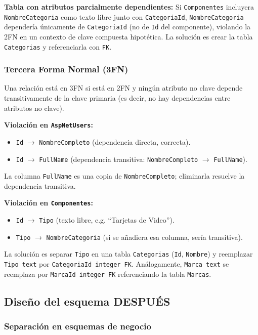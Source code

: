 \textbf{Tabla con atributos parcialmente dependientes:} Si \texttt{Componentes} incluyera \texttt{NombreCategoria} como texto libre junto con \texttt{CategoriaId}, \texttt{NombreCategoria} depender\'ia \'unicamente de \texttt{CategoriaId} (no de \texttt{Id} del componente), violando la 2FN en un contexto de clave compuesta hipot\'etica.
La soluci\'on es crear la tabla \texttt{Categorias} y referenciarla con \texttt{FK}.

\subsubsection{Tercera Forma Normal (3FN)}

Una relaci\'on est\'a en 3FN si est\'a en 2FN y ning\'un atributo no clave depende transitivamente de la clave primaria (es decir, no hay dependencias entre atributos no clave).

\textbf{Violaci\'on en \texttt{AspNetUsers}:}
\begin{itemize}
  \item \texttt{Id} $\rightarrow$ \texttt{NombreCompleto} (dependencia directa, correcta).
  \item \texttt{Id} $\rightarrow$ \texttt{FullName} (dependencia transitiva: \texttt{NombreCompleto} $\rightarrow$ \texttt{FullName}).
\end{itemize}
La columna \texttt{FullName} es una copia de \texttt{NombreCompleto}; eliminarla resuelve la dependencia transitiva.

\textbf{Violaci\'on en \texttt{Componentes}:}
\begin{itemize}
  \item \texttt{Id} $\rightarrow$ \texttt{Tipo} (texto libre, e.g. ``Tarjetas de Video'').
  \item \texttt{Tipo} $\rightarrow$ \texttt{NombreCategoria} (si se a\~nadiera esa columna, ser\'ia transitiva).
\end{itemize}
La soluci\'on es separar \texttt{Tipo} en una tabla \texttt{Categorias} (\texttt{Id}, \texttt{Nombre}) y reemplazar \texttt{Tipo text} por \texttt{CategoriaId integer FK}.
An\'alogamente, \texttt{Marca text} se reemplaza por \texttt{MarcaId integer FK} referenciando la tabla \texttt{Marcas}.

\subsection{Dise\~no del esquema DESPU\'ES}

\subsubsection{Separaci\'on en esquemas de negocio}

